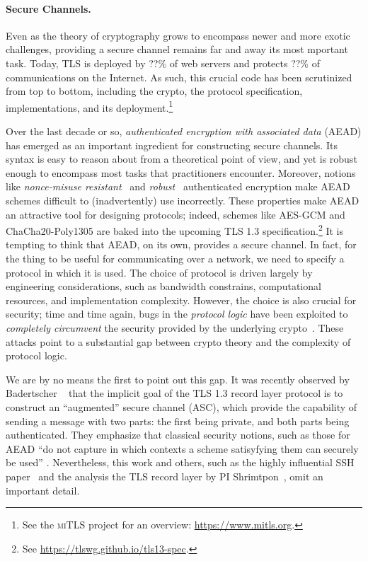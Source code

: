\paragraph{Secure Channels. }
Even as the theory of cryptography grows to encompass newer and more exotic
challenges, providing a secure channel remains far and away its most mportant
task.
%
Today, TLS is deployed by ??\% of web servers and protects ??\% of
communications on the Internet.
%
%
As such, this crucial code has been scrutinized
from top to bottom, including the crypto, the protocol specification,
implementations, and its deployment.\footnote{ See the \textsc{miTLS} project
for an overview: \url{https://www.mitls.org}.}
%

Over the last decade or so, \emph{authenticated encryption with associated data}
(AEAD) has emerged as an important ingredient for constructing secure channels.
%
Its syntax is easy to reason about from a theoretical point of view, and yet is
robust enough to encompass most tasks that practitioners encounter. Moreover,
notions like \emph{nonce-misuse resistant}~\cite{RS07} and
\emph{robust}~\cite{HKR14} authenticated encryption make AEAD schemes difficult
to (inadvertently) use incorrectly. These properties make AEAD an attractive
tool for designing protocols; indeed, schemes like AES-GCM and
ChaCha20\mbox{-}Poly1305 are baked into the upcoming TLS 1.3
specification.\footnote{ See \url{https://tlswg.github.io/tls13-spec}.}
%
It is tempting to think that AEAD, on its own, provides a secure channel. In
fact, for the thing to be useful for communicating over a network, we need to
specify a protocol in which it is used. The choice of protocol is driven largely
by engineering considerations, such as bandwidth constrains, computational
resources, and implementation complexity. However, the choice is also crucial
for security; time and time again, bugs in the \emph{protocol logic} have been
exploited to \emph{completely circumvent} the security provided by the
underlying crypto~\cite{BKN02}. These attacks point to a substantial gap between
crypto theory and the complexity of protocol logic.

We are by no means the first to point out this gap. It was recently observed by
Badertscher \etal~\cite{BMM+15} that the implicit goal of the TLS 1.3 record
layer protocol is to construct an ``augmented'' secure channel (ASC), which
provide the capability of sending a message with two parts: the first being
private, and both parts being authenticated. They emphasize that classical
security notions, such as those for AEAD ``do not capture in which contexts a
scheme satisyfying them can securely be used'' \cite[pp. 2]{BMM+15}.
Nevertheless, this work and others, such as the highly influential SSH
paper~\cite{BKN02} and the analysis the TLS record layer by PI
Shrimtpon~\cite{PRS11}, omit an important detail.

